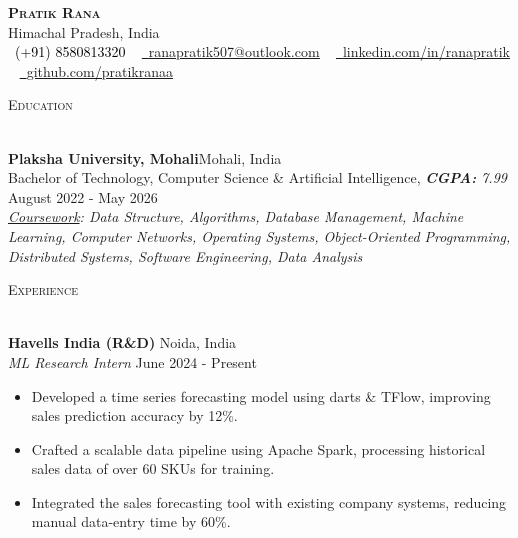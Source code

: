 \documentclass[a4paper]{article}
\newcommand{\tinyBulletSep} { \vspace{1.2mm} }
\newcommand{\bulletSep} { \vspace{1.5mm} }
\newcommand{\sectionSep} { \vspace{2.5mm} }
\newcommand{\lineunder} {
    \vspace*{-8pt} \\
    \hspace*{-15pt} \hrulefill \\
}
\newcommand{\header} [1] {
    {\hspace*{-18pt}\vspace*{6pt} {
        \fontfamily{qcs}\selectfont \large \scshape #1
    }}
    \vspace*{-6pt} \lineunder
    \vspace{1.1mm}
}
\newcommand{\educationItem}[6]{
    \textbf{#1}\hfill #2\\
    #3, \textit{#4} \hfill #5\\
    #6
}
\newcommand{\experienceItem}[5]{
    \textbf{#1} \hfill #2 \\
    \textit{#3} \hfill #4 \\
    #5
}
\begin{document}

\begin{center}
    {\textbf{\Huge \scshape Pratik Rana}} \\ \vspace{1pt}
    Himachal Pradesh, India \\
    \small \textcolor{black}{\raisebox{-0.1\height}\faPhone\
        (+91) 8580813320} ~ \href{mailto:ranapratik507@outlook.com}{{\raisebox{-0.2\height}\faEnvelope\  \underline{ranapratik507@outlook.com}}} ~
    \href{https://www.linkedin.com/in/ranapratik/}{{\raisebox{-0.2\height}\faLinkedinSquare\ \underline{linkedin.com/in/ranapratik}}}  ~
    \href{https://github.com/pratikranaa}{{\raisebox{-0.2\height}\faGithub\ \underline{github.com/pratikranaa}}}
\end{center}

\vspace{-2mm}

\hypersetup {
    urlcolor     = blue, %
}


\header{Education}

\educationItem{Plaksha University, Mohali}{Mohali, India}{Bachelor of Technology, Computer Science \& Artificial Intelligence}{\textbf{CGPA:} 7.99}{August 2022 - May 2026}{
    \tinyBulletSep
    \textit{\underline{Coursework}: Data Structure, Algorithms, Database Management, Machine Learning, Computer Networks, Operating Systems, Object-Oriented Programming, Distributed Systems, Software Engineering, Data Analysis}
}

\sectionSep


\header{Experience}

\experienceItem{Havells India (R\&D)}{Noida, India}{ML Research Intern}{June 2024 - Present}{
\begin{itemize}
    \item Developed a time series forecasting model using darts \& TFlow, improving sales prediction accuracy by 12\%.
    \item Crafted a scalable data pipeline using Apache Spark, processing historical sales data of over 60 SKUs for training.
    \item Integrated the sales forecasting tool with existing company systems, reducing manual data-entry time by 60\%.
\end{itemize}
}
\bulletSep
\end{document}
